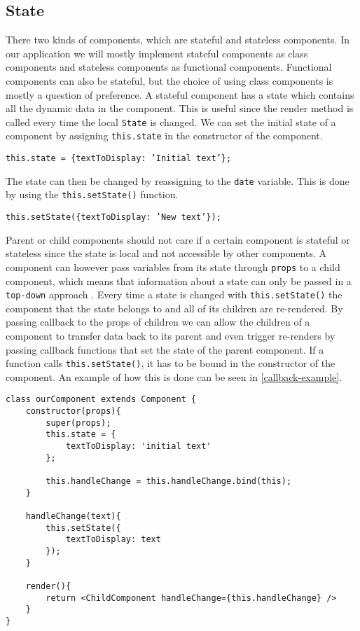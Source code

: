 \subsection*{State}
There two kinds of components, which are stateful and stateless components.
In our application we will mostly implement stateful components as class components and stateless components as functional components. 
Functional components can also be stateful, but the choice of using class components is mostly a question of preference.
A stateful component has a state which contains all the dynamic data in the component.
This is useful since the render method is called every time the local \texttt{State} is changed.
We can set the initial state of a component by assigning \texttt{this.state} in the constructor of the component.
\begin{center}
    \texttt{this.state = \{textToDisplay: 'Initial text'\};}
\end{center}
The state can then be changed by reassigning to the \texttt{date} variable.
This is done by using the \texttt{this.setState()} function.
\begin{center}
    \texttt{this.setState(\{textToDisplay: 'New text'\});}
\end{center}
Parent or child components should not care if a certain component is stateful or stateless since the state is local and not accessible by other components.
A component can however pass variables from its state through \texttt{props} to a child component, which means that information about a state can only be passed in a \texttt{top-down} approach \cite{ReactJS}.
Every time a state is changed with \texttt{this.setState()} the component that the state belongs to and all of its children are re-rendered.
By passing callback to the props of children we can allow  the children of a component to transfer data back to its parent and even trigger re-renders by passing callback functions that set the state of the parent component.
If a function calls \texttt{this.setState()}, it has to be bound in the constructor of the component.
An example of how this is done can be seen in \autoref{callback-example}.
\begin{lstlisting}[caption={An example of a callback function}, label={callback-example}]
class ourComponent extends Component {
	constructor(props){
		super(props);
		this.state = {
			textToDisplay: 'initial text'
		};

		this.handleChange = this.handleChange.bind(this);
	}

	handleChange(text){
		this.setState({
			textToDisplay: text
		});
	}

	render(){
		return <ChildComponent handleChange={this.handleChange} />
	}
}
\end{lstlisting}


